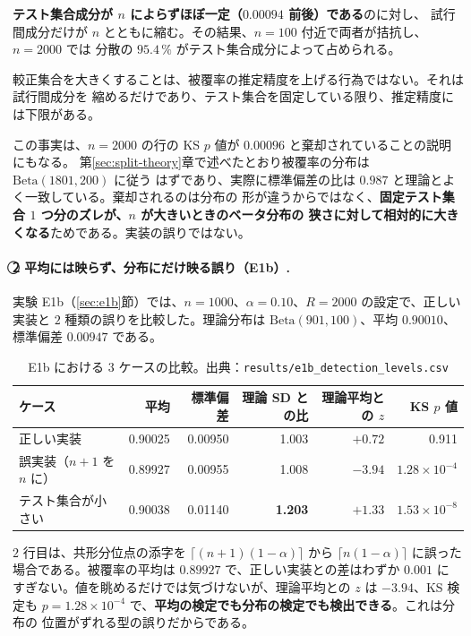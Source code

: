 \documentclass[a4paper,11pt]{jsarticle}
\theoremstyle{definition}
\theoremstyle{plain}
\theoremstyle{remark}
\newcommand{\encircle}[1]{\textcircled{\scriptsize #1}}   %
\begin{document}
\textbf{テスト集合成分が $n$ によらずほぼ一定（$0.00094$ 前後）である}のに対し、
試行間成分だけが $n$ とともに縮む。その結果、$n=100$ 付近で両者が拮抗し、$n=2000$ では
分散の $95.4\,\%$ がテスト集合成分によって占められる。

較正集合を大きくすることは、被覆率の推定精度を上げる行為ではない。それは試行間成分を
縮めるだけであり、テスト集合を固定している限り、推定精度には下限がある。

この事実は、$n=2000$ の行の KS $p$ 値が $0.00096$ と棄却されていることの説明にもなる。
第\ref{sec:split-theory}章で述べたとおり被覆率の分布は $\mathrm{Beta}(1801,200)$ に従う
はずであり、実際に標準偏差の比は $0.987$ と理論とよく一致している。棄却されるのは分布の
形が違うからではなく、\textbf{固定テスト集合 $1$ つ分のズレが、$n$ が大きいときのベータ分布の
狭さに対して相対的に大きくなる}ためである。実装の誤りではない。

\paragraph{\encircle{2} 平均には映らず、分布にだけ映る誤り（E1b）.}
実験 E1b（\ref{sec:e1b}節）では、$n=1000$、$\alpha=0.10$、$R=2000$ の設定で、正しい実装と
$2$ 種類の誤りを比較した。理論分布は $\mathrm{Beta}(901,100)$、平均 $0.90010$、
標準偏差 $0.00947$ である。

\begin{table}[htbp]
  \centering
  \caption{E1b における $3$ ケースの比較。出典：\texttt{results/e1b\_detection\_levels.csv}}
  \label{tab:e1b-cases}
  \small
  \begin{tabular}{lrrrrr}
    \toprule
    ケース & 平均 & 標準偏差 & 理論 SD との比 & 理論平均との $z$ & KS $p$ 値 \\
    \midrule
    正しい実装 & 0.90025 & 0.00950 & 1.003 & $+0.72$ & 0.911 \\
    誤実装（$n+1$ を $n$ に） & 0.89927 & 0.00955 & 1.008 & $-3.94$ & $1.28\times10^{-4}$ \\
    テスト集合が小さい & 0.90038 & 0.01140 & \textbf{1.203} & $+1.33$ & $1.53\times10^{-8}$ \\
    \bottomrule
  \end{tabular}
\end{table}

$2$ 行目は、共形分位点の添字を $\lceil(n+1)(1-\alpha)\rceil$ から $\lceil n(1-\alpha)\rceil$
に誤った場合である。被覆率の平均は $0.89927$ で、正しい実装との差はわずか $0.001$ に
すぎない。値を眺めるだけでは気づけないが、理論平均との $z$ は $-3.94$、KS 検定も
$p=1.28\times10^{-4}$ で、\textbf{平均の検定でも分布の検定でも検出できる}。これは分布の
位置がずれる型の誤りだからである。
\end{document}
